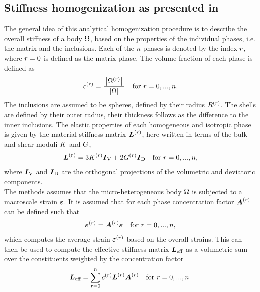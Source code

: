 \subsection{Stiffness homogenization as presented in \cite{nee_2012_ammf}}
The general idea of this analytical homogenization procedure is to describe the overall stiffness of a body $\Omega$, based on the properties of the individual phases, i.e. the matrix and the inclusions.
Each of the $n$ phases is denoted by the index $r$, where $r = 0$ is defined as the matrix phase.
The volume fraction of each phase is defined as
\begin{align}
	c^{(r)} = \frac{\left\| \Omega^{(r)} \right\|}{\left\| \Omega \right\|} \quad  \text{for}~ r = 0, ..., n.
\end{align}
The inclusions are assumed to be spheres, defined by their radius $R^{(r)}$.
The shells are defined by their outer radius, their thickness follows as the difference to the inner inclusions.
The elastic properties of each homogeneous and isotropic phase is given by the material stiffness matrix $\boldsymbol{L}^{(r)}$, here written in terms of the bulk and shear moduli $K$ and $G$,
\begin{align}
	\boldsymbol{L}^{(r)}= 3 K^{(r)} \boldsymbol{I}_{\text{V}} + 2 G^{(r)} \boldsymbol{I}_{\text{D}}  \quad \text{for}~ r = 0, ..., n, \label{eq:Lr}
\end{align}
where $\boldsymbol{I}_{\text{V}}$ and $\boldsymbol{I}_{\text{D}}$ are the orthogonal projections of the volumetric and deviatoric components.\\
The methods assumes that the micro-heterogeneous body $\Omega$ is subjected to a macroscale strain $\boldsymbol{\varepsilon}$.
It is assumed that for each phase concentration factor $\boldsymbol{A}^{(r)}$ can be defined such that
\begin{align}
	\boldsymbol{\varepsilon}^{(r)} = \boldsymbol{A}^{(r)}\boldsymbol{\varepsilon} \quad  \text{for}~ r = 0, ..., n, \label{eq:strainaverage}
\end{align}
which computes the average strain $\boldsymbol{\varepsilon}^{(r)}$ based on the overall strains.
This can then be used to compute the effective stiffness matrix $\boldsymbol{L}_{\text{eff}}$ as a volumetric sum over the constituents weighted by the concentration factor 
\begin{align}
	\boldsymbol{L}_{\text{eff}} = \sum_{r=0}^{n} c^{(r)} \boldsymbol{L}^{(r)}\boldsymbol{A}^{(r)} \quad  \text{for}~ r = 0, ..., n.\label{eq:Leff}
\end{align}

